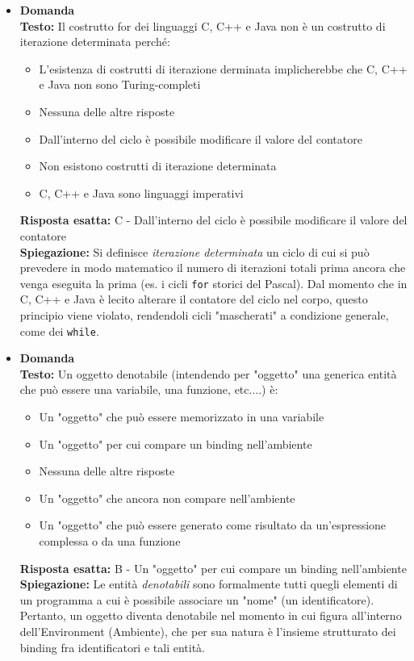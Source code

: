 \documentclass[12pt, a4paper]{article}
\newcounter{domandateoria}
\begin{document}
\begin{itemize}
    \item {}\textbf{Domanda \thedomandateoria} \\
    \textbf{Testo:} Il costrutto for dei linguaggi C, C++ e Java non è un costrutto di iterazione determinata perché:
    \begin{itemize}
        \item[A)] L'esistenza di costrutti di iterazione derminata implicherebbe che C, C++ e Java non sono Turing-completi
        \item[B)] Nessuna delle altre risposte
        \item[C)] Dall'interno del ciclo è possibile modificare il valore del contatore
        \item[D)] Non esistono costrutti di iterazione determinata
        \item[E)] C, C++ e Java sono linguaggi imperativi
    \end{itemize}
    \textbf{Risposta esatta:} C - Dall'interno del ciclo è possibile modificare il valore del contatore \\
    \textbf{Spiegazione:} Si definisce \textit{iterazione determinata} un ciclo di cui si può prevedere in modo matematico il numero di iterazioni totali prima ancora che venga eseguita la prima (es. i cicli \texttt{for} storici del Pascal). Dal momento che in C, C++ e Java è lecito alterare il contatore del ciclo nel corpo, questo principio viene violato, rendendoli cicli "mascherati" a condizione generale, come dei \texttt{while}.
    \vspace{0.3cm}

    \item {}\textbf{Domanda \thedomandateoria} \\
    \textbf{Testo:} Un oggetto denotabile (intendendo per "oggetto" una generica entità che può essere una variabile, una funzione, etc....) è:
    \begin{itemize}
        \item[A)] Un "oggetto" che può essere memorizzato in una variabile
        \item[B)] Un "oggetto" per cui compare un binding nell'ambiente
        \item[C)] Nessuna delle altre risposte
        \item[D)] Un "oggetto" che ancora non compare nell'ambiente
        \item[E)] Un "oggetto" che può essere generato come risultato da un'espressione complessa o da una funzione
    \end{itemize}
    \textbf{Risposta esatta:} B - Un "oggetto" per cui compare un binding nell'ambiente \\
    \textbf{Spiegazione:} Le entità \textit{denotabili} sono formalmente tutti quegli elementi di un programma a cui è possibile associare un "nome" (un identificatore). Pertanto, un oggetto diventa denotabile nel momento in cui figura all'interno dell'Environment (Ambiente), che per sua natura è l'insieme strutturato dei binding fra identificatori e tali entità.
    \vspace{0.3cm}


\end{itemize}
\end{document}
